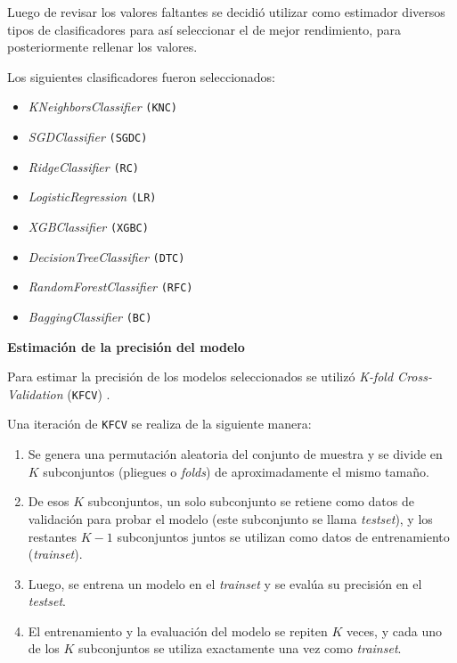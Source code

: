 \documentclass[a4paper,12pt]{article}
\begin{document}
		Luego de revisar los valores faltantes se decidió utilizar como estimador diversos tipos de clasificadores para así seleccionar el de mejor rendimiento, para posteriormente rellenar los valores.
				
		Los siguientes clasificadores fueron seleccionados:
				
		\begin{itemize}[noitemsep, topsep=2pt]
			\item \textit{KNeighborsClassifier} \texttt{(KNC)}
			\item \textit{SGDClassifier} \texttt{(SGDC)}
			\item \textit{RidgeClassifier} \texttt{(RC)}
			\item \textit{LogisticRegression} \texttt{(LR)}
			\item \textit{XGBClassifier} \texttt{(XGBC)}
			\item \textit{DecisionTreeClassifier} \texttt{(DTC)}
			\item \textit{RandomForestClassifier} \texttt{(RFC)}
			\item \textit{BaggingClassifier} \texttt{(BC)}
		\end{itemize}
				
		\hfill
				
		\textbf{Estimación de la precisión del modelo}
				
		Para estimar la precisión de los modelos seleccionados se utilizó \textit{K-fold Cross-Validation} (\texttt{KFCV}) \citep{kfolds}.
				
		Una iteración de \texttt{KFCV} se realiza de la siguiente manera: 
				
		\begin{enumerate}[noitemsep, topsep=2pt]
			\item Se genera una permutación aleatoria del conjunto de muestra y se divide en $K$ subconjuntos (pliegues o \textit{folds}) de aproximadamente el mismo tamaño.
			\item De esos $K$ subconjuntos, un solo subconjunto se retiene como datos de validación para probar el modelo (este subconjunto se llama \textit{testset}), y los restantes $K-1$ subconjuntos juntos se utilizan como datos de entrenamiento (\textit{trainset}).
			\item Luego, se entrena un modelo en el \textit{trainset} y se evalúa su precisión en el \textit{testset}. 
			\item El entrenamiento y la evaluación del modelo se repiten $K$ veces, y cada uno de los $K$ subconjuntos se utiliza exactamente una vez como \textit{trainset}.
		\end{enumerate}
				
\end{document}
